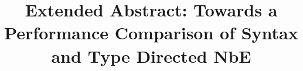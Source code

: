 \documentclass[sigplan,nonacm]{acmart}
\title{Extended Abstract: Towards a Performance Comparison of Syntax and Type Directed NbE}
\begin{document}
\begin{abstract}
        
\end{abstract}

\maketitle







\end{document}
